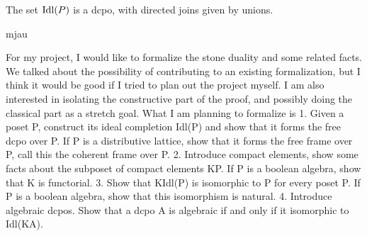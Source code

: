 \begin{proposition}
  The set \(\operatorname{Idl}(P)\) is a dcpo, with directed joins given by unions.
\end{proposition}

mjau

For my project, I would like to formalize the stone duality and some related facts. We talked about the possibility of contributing to an existing formalization, but I think it would be good if I tried to plan out the project myself. I am also interested in isolating the constructive part of the proof, and possibly doing the classical part as a stretch goal. What I am planning to formalize is
1. Given a poset P, construct its ideal completion Idl(P) and show that it forms the free dcpo over P. If P is a distributive lattice, show that it forms the free frame over P, call this the coherent frame over P.
2. Introduce compact elements, show some facts about the subposet of compact elements KP. If P is a boolean algebra, show that K is functorial.
3. Show that KIdl(P) is isomorphic to P for every poset P. If P is a boolean algebra, show that this isomorphism is natural.
4. Introduce algebraic dcpos. Show that a dcpo A is algebraic if and only if it isomorphic to Idl(KA).
